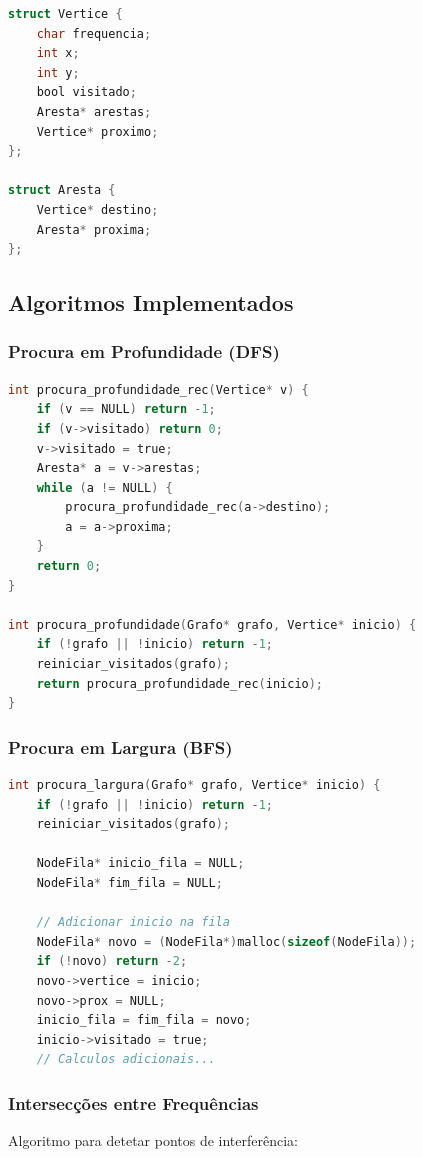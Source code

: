 \documentclass[a4paper,12pt]{report}
\begin{document}
\begin{lstlisting}[language=C]
struct Vertice {
    char frequencia;
    int x;
    int y;
    bool visitado;
    Aresta* arestas;
    Vertice* proximo;
};

struct Aresta {
    Vertice* destino;
    Aresta* proxima;
};
\end{lstlisting}

\subsection{Algoritmos Implementados}
\subsubsection{Procura em Profundidade (DFS)}

\begin{lstlisting}[language=C]
int procura_profundidade_rec(Vertice* v) {
    if (v == NULL) return -1;
    if (v->visitado) return 0;
    v->visitado = true;
    Aresta* a = v->arestas;
    while (a != NULL) {
        procura_profundidade_rec(a->destino);
        a = a->proxima;
    }
    return 0;
}

int procura_profundidade(Grafo* grafo, Vertice* inicio) {
    if (!grafo || !inicio) return -1;
    reiniciar_visitados(grafo);
    return procura_profundidade_rec(inicio);
}

\end{lstlisting}
\subsubsection{Procura em Largura (BFS)}

\begin{lstlisting}[language=C]
int procura_largura(Grafo* grafo, Vertice* inicio) {
    if (!grafo || !inicio) return -1;
    reiniciar_visitados(grafo);
    
    NodeFila* inicio_fila = NULL;
    NodeFila* fim_fila = NULL;
    
    // Adicionar inicio na fila
    NodeFila* novo = (NodeFila*)malloc(sizeof(NodeFila));
    if (!novo) return -2;
    novo->vertice = inicio;
    novo->prox = NULL;
    inicio_fila = fim_fila = novo;
    inicio->visitado = true;
    // Calculos adicionais...

\end{lstlisting}

\subsubsection{Intersecções entre Frequências}
Algoritmo para detetar pontos de interferência:
\end{document}
